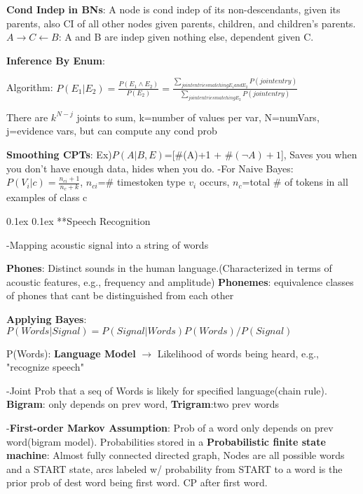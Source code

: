 \documentclass[10pt,landscape]{article}
\makeatletter
\renewcommand{\section}{\@startsection{section}{1}{0mm}%
                                {0.1ex}%
                                {0.1ex}%
                                {\normalfont\normalsize\bfseries}}
\makeatother
\begin{document}
\begin{multicols}{3}
\textbf{Cond Indep in BNs}: A node is cond indep of its non-descendants, given its parents, also CI of all other nodes given parents, children, and children's parents.  $A\to C \leftarrow B$: A and B are indep given nothing else, dependent given C.

\textbf{Inference By Enum}:

Algorithm: $P(E_1|E_2)=\frac{P(E_1\land E_2)}{P(E_2)}=\frac{\sum_{joint entries matching E_1 and E_2}P(joint entry)}{\sum_{joint entries matching E_2}P(joint entry)}$

There are $k^{N-j}$ joints to sum, k=number of values per var, N=numVars, j=evidence vars, but can compute any cond prob

\textbf{Smoothing CPTs}: Ex)$P(A|B,E)$=[\#(A)+1 + \#$(\neg A)+1$], Saves you when you don't have enough data, hides when you do.
-For Naive Bayes: $P(V_i|c)=\frac{n_{ci}+1}{n_c+k}$, $n_{ci}$=\# timestoken type $v_i$ occurs, $n_c$=total \# of tokens in all examples of class c



\section{**Speech Recognition}

-Mapping acoustic signal into a string of words

\textbf{Phones}: Distinct sounds in the human language.(Characterized in terms of acoustic features, e.g., frequency and amplitude) \textbf{Phonemes}: equivalence classes of phones that cant be distinguished from each other

\textbf{Applying Bayes}: $P(Words|Signal)=P(Signal|Words)P(Words)/P(Signal)$

P(Words): \textbf{Language Model} $\to$ Likelihood of words being heard, e.g., "recognize speech"

-Joint Prob that a seq of Words is likely for specified language(chain rule). \textbf{Bigram}: only depends on prev word, \textbf{Trigram}:two prev words

-\textbf{First-order Markov Assumption}: Prob of a word only depends on prev word(bigram model). Probabilities stored in a \textbf{Probabilistic finite state machine}: Almost fully connected directed graph, Nodes are all possible words and a START state, arcs labeled w/ probability from START to a word is the prior prob of dest word being first word. CP after first word.


\end{multicols}
\end{document}
